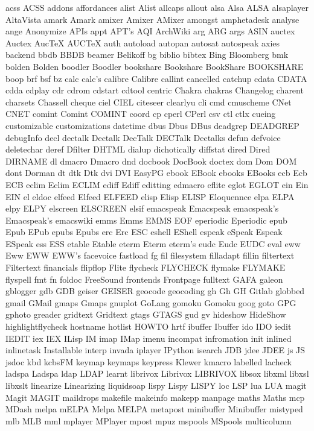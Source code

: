 acss
ACSS
addons
affordances
alist
Alist
allcaps
allout
alsa
Alsa
ALSA
alsaplayer
AltaVista
amark
Amark
amixer
Amixer
AMixer
amongst
amphetadesk
analyse
ange
Anonymize
APIs
appt
APT's
AQI
ArchWiki
arg
ARG
args
ASIN
auctex
Auctex
AucTeX
AUCTeX
auth
autoload
autopan
autosat
autospeak
axies
backend
bbdb
BBDB
beamer
Belikoff
bg
biblio
bibtex
Bing
Bloomberg
bmk
bolden
Bolden
boodler
Boodler
bookshare
Bookshare
BookShare
BOOKSHARE
boop
brf
bsf
bz
calc
calc's
calibre
Calibre
callint
cancelled
catchup
cdata
CDATA
cdda
cdplay
cdr
cdrom
cdstart
cdtool
centric
Chakra
chakras
Changelog
charent
charsets
Chassell
cheque
ciel
CIEL
citeseer
clearlyu
cli
cmd
cmuscheme
CNet
CNET
comint
Comint
COMINT
coord
cp
cperl
CPerl
csv
ctl
ctlx
cueing
customizable
customizations
datetime
dbus
Dbus
DBus
deadgrep
DEADGREP
debugInfo
decl
dectalk
Dectalk
DecTalk
DECTalk
Dectalks
defun
defvoice
deletechar
deref
Dfilter
DHTML
dialup
dichotically
diffstat
dired
Dired
DIRNAME
dl
dmacro
Dmacro
dnd
docbook
DocBook
doctex
dom
Dom
DOM
dont
Dorman
dt
dtk
Dtk
dvi
DVI
EasyPG
ebook
EBook
ebooks
EBooks
ecb
Ecb
ECB
eclim
Eclim
ECLIM
ediff
Ediff
editting
edmacro
eflite
eglot
EGLOT
ein
Ein
EIN
el
eldoc
elfeed
Elfeed
ELFEED
elisp
Elisp
ELISP
Eloquennce
elpa
ELPA
elpy
ELPY
elscreen
ELSCREEN
elsif
emacspeak
Emacspeak
emacspeak's
Emacspeak's
emacswiki
emms
Emms
EMMS
EOF
eperiodic
Eperiodic
epub
Epub
EPub
epubs
Epubs
erc
Erc
ESC
eshell
EShell
espeak
eSpeak
Espeak
ESpeak
ess
ESS
etable
Etable
eterm
Eterm
eterm's
eudc
Eudc
EUDC
eval
eww
Eww
EWW
EWW's
facevoice
fastload
fg
fil
filesystem
filladapt
fillin
filtertext
Filtertext
financials
flipflop
Flite
flycheck
FLYCHECK
flymake
FLYMAKE
flyspell
fmt
fn
foldoc
FreeSound
frontends
Frontpage
fulltext
GAFA
galeon
gblogger
gdb
GDB
geiser
GEISER
geocode
geocoding
gh
Gh
GH
Gitlab
globbed
gmail
GMail
gmaps
Gmaps
gnuplot
GoLang
gomoku
Gomoku
goog
goto
GPG
gphoto
greader
gridtext
Gridtext
gtags
GTAGS
gud
gv
hideshow
HideShow
highlightflycheck
hostname
hotlist
HOWTO
hrtf
ibuffer
Ibuffer
ido
IDO
iedit
IEDIT
iex
IEX
ILisp
IM
imap
IMap
imenu
incompat
infromation
init
inlined
inlinetask
Installable
interp
invada
iplayer
IPython
isearch
JDB
jdee
JDEE
js
JS
jsdoc
kbd
kcbsFM
keymap
keymaps
keypress
Klewer
kmacro
labelled
lacheck
ladspa
Ladspa
ldap
LDAP
learnt
librivox
Librivox
LIBRIVOX
libsox
libxml
libxsl
libxslt
linearize
Linearizing
liquidsoap
lispy
Lispy
LISPY
loc
LSP
lua
LUA
magit
Magit
MAGIT
maildrops
makefile
makeinfo
makepp
manpage
maths
Maths
mcp
MDash
melpa
mELPA
Melpa
MELPA
metapost
minibuffer
Minibuffer
mistyped
mlb
MLB
mml
mplayer
MPlayer
mpost
mpuz
mspools
MSpools
multicolumn
